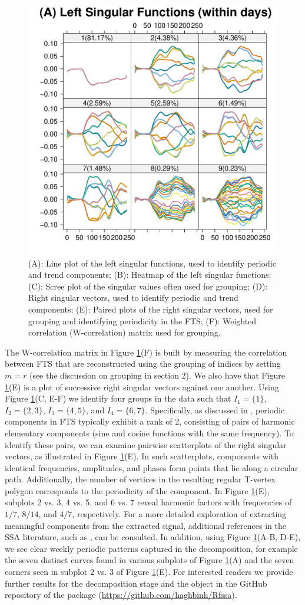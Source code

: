 \begin{figure}[t!]
	\includegraphics[page=6,width=.32\textwidth]{figures/fssa_call.pdf}
	\caption{(A): Line plot of the left singular functions, used to identify 
	periodic and trend components; (B): Heatmap of the left singular functions; (C): 
	Scree plot of the singular values often used for grouping; (D): Right singular 
	vectors, used to identify periodic and trend components; (E): Paired plots of 
	the right singular vectors, used for grouping and identifying periodicity in the 
	FTS; (F): Weighted correlation (W-correlation) matrix used for grouping.}
	\label{fig:call_decomp}
\end{figure}

The W-correlation matrix in Figure \ref{fig:call_decomp}(F) is built by measuring 
the correlation between FTS that are reconstructed using the grouping of indices by 
setting $m=r$ (see the discussion on grouping in section 2). We also have that 
Figure \ref{fig:call_decomp}(E) is a plot of successive right singular vectors 
against one another. Using Figure \ref{fig:call_decomp}(C, E-F) we identify four 
groups in the  data such that $I_{1}=\{1\}$, $I_{2} = \{2,3\}$, 
$I_{3}=\{4,5\}$, and $I_{4}=\{6,7\}$.
Specifically, as discussed in \cite{golyandina2001}, periodic components in FTS typically exhibit a rank of 2, consisting of pairs of harmonic elementary components (sine and cosine functions with the same frequency). To identify these pairs, we can examine pairwise scatterplots of the right singular vectors, as illustrated in Figure \ref{fig:call_decomp}(E). In such scatterplots, components with identical frequencies, amplitudes, and phases form points that lie along a circular path. Additionally, the number of vertices in the resulting regular T-vertex polygon corresponds to the periodicity of the component. In Figure \ref{fig:call_decomp}(E), subplots 2 vs. 3, 4 vs. 5, and 6 vs. 7 reveal harmonic factors with frequencies of $1/7$, $8/14$, and $4/7$, respectively. For a more detailed exploration of extracting meaningful components from the extracted signal, additional references in the SSA literature, such as \cite{golyandina2013}, can be consulted.
In addition, using Figure 
\ref{fig:call_decomp}(A-B, D-E), we see clear weekly periodic patterns captured in 
the decomposition, for example the seven distinct curves found in various subplots 
of Figure \ref{fig:call_decomp}(A) and the seven corners seen in subplot 2 vs. 3 of 
Figure \ref{fig:call_decomp}(E).
For interested readers we provide further results for the decomposition stage and the  object in the GitHub repository of the  package (\url{https://github.com/haghbinh/Rfssa}).


